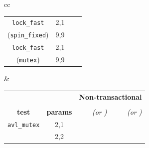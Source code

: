 \begin{table}[t]
\begin{center}
\begin{tabular}{cc}
\begin{tabular}{cc||r|r}
			\hline
			{\tt lock\_fast}
			& 2,1 & \cpu{3.36} & \ints{1}	\\
			({\tt spin\_fixed})
			& 9,9 & \cpu{4.91} & \ints{1}	\\
			\hline
			{\tt lock\_fast}
			& 2,1 & \cpu{3.40} & \ints{1}	\\
			({\tt mutex})
			& 9,9 & \cpu{4.71} & \ints{1}	\\
			\end{tabular}
			&
			\begin{tabular}{cc||r|r}
			& & \multicolumn{2}{c}{\bf Non-transactional} \\
			& & \cpu{\bf cpu (s)} & \ints{\bf SS size} \\
			\bf test & \bf params & \em (or \ETAdag{\bf \em ETA}) & \em (or \ETAdag{\bf \em est.}) \\
			\hline
			\hline
			{\tt avl\_mutex}
			& 2,1 & \cpu{2.49} & \ints{3} \\
			& 2,2 & \cpu{2.44} & \ints{3} \\

\end{tabular}
\end{tabular}
\end{center}
\end{table}
